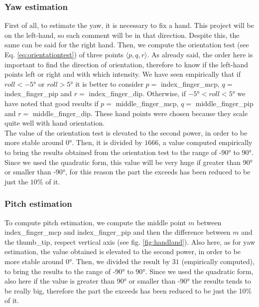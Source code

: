 \subsubsection{Yaw estimation}
\label{subsec:yaw}
First of all, to estimate the yaw, it is necessary to fix a hand. This project will be on the left-hand, so each comment will be in that direction. Despite this, the same can be said for the right hand. Then, we compute the orientation test (see Eq. \ref{eq:orientationtest}) of three points $\langle p, q, r \rangle$. As already said, the order here is important to find the direction of orientation, therefore to know if the left-hand points left or right and with which intensity. We have seen empirically that if $roll < \ang{-5}$ or $roll > \ang{+5}$ it is better to consider $p=$ index\_finger\_mcp, $q=$ index\_finger\_pip and $r=$ index\_finger\_dip. Otherwise, if $\ang{-5} < roll < \ang{+5}$ we have noted that good results if $p=$ middle\_finger\_mcp, $q=$ middle\_finger\_pip and $r=$ middle\_finger\_dip. These hand points were chosen because they scale quite well with hand orientation. \\

\noindent The value of the orientation test is elevated to the second power, in order to be more stable around \ang{0}. Then, it is divided by $1666$, a value computed empirically to bring the results obtained from the orientation test to the range of \ang{-90} to \ang{+90}. Since we used the quadratic form, this value will be very huge if greater than \ang{+90} or smaller than \ang{-90}, for this reason the part the exceeds has been reduced to be just the $10\%$ of it.

\subsubsection{Pitch estimation}
\label{subsec:pitch}
To compute pitch estimation, we compute the middle point $m$ between index\_finger\_mcp and index\_finger\_pip and then the difference between $m$ and the thumb\_tip, respect vertical axis (see fig. \ref{fig:handland}). Also here, as for yaw estimation, the value obtained is elevated to the second power, in order to be more stable around \ang{0}. Then, we divided the result by $31$ (empirically computed), to bring the results to the range of \ang{-90} to \ang{90}. Since we used the quadratic form, also here if the value is greater than \ang{90} or smaller than \ang{-90} the results tends to be really big, therefore the part the exceeds has been reduced to be just the 10\% of it.

